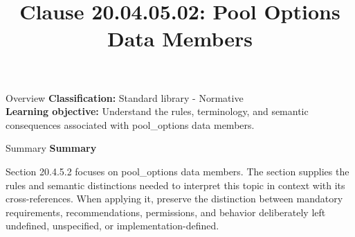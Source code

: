 \documentclass[10pt,letterpaper]{article}
\title{Clause 20.04.05.02: Pool Options Data Members}
\author{}
\date{}
\begin{document}
\maketitle
\begin{CornellOverviewBox}{Overview}
\textbf{Classification:} Standard library - Normative\\[2pt]
\textbf{Learning objective:} Understand the rules, terminology, and semantic consequences associated with pool\_options data members.
\end{CornellOverviewBox}\begin{CornellSummaryBox}{Summary}
{\sffamily\bfseries\color{Accent} Summary}\par\vspace{3pt}Section 20.4.5.2 focuses on pool\_options data members. The section supplies the rules and semantic distinctions needed to interpret this topic in context with its cross-references. When applying it, preserve the distinction between mandatory requirements, recommendations, permissions, and behavior deliberately left undefined, unspecified, or implementation-defined.
\end{CornellSummaryBox}
\end{document}
